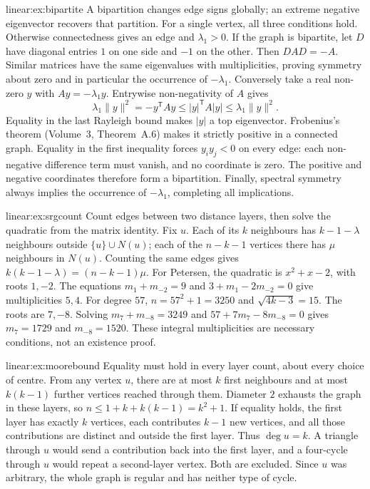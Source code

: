 \begin{solution}{linear:ex:bipartite}
\idea A bipartition changes edge signs globally; an extreme negative eigenvector recovers that partition.
\writeup For a single vertex, all three conditions hold. Otherwise connectedness gives an edge and $\lambda_1>0$. If the graph is bipartite, let $D$ have diagonal entries $1$ on one side and $-1$ on the other. Then $DAD=-A$. Similar matrices have the same eigenvalues with multiplicities, proving symmetry about zero and in particular the occurrence of $-\lambda_1$.
Conversely take a real non-zero $y$ with $Ay=-\lambda_1y$. Entrywise non-negativity of $A$ gives
\[
\lambda_1\|y\|^2=-y^{\mathsf T}Ay
\le |y|^{\mathsf T}A|y|\le\lambda_1\|y\|^2.
\]
Equality in the last Rayleigh bound makes $|y|$ a top eigenvector. Frobenius's theorem (Volume~3, Theorem~A.6) makes it strictly positive in a connected graph. Equality in the first inequality forces $y_iy_j<0$ on every edge: each non-negative difference term must vanish, and no coordinate is zero. The positive and negative coordinates therefore form a bipartition. Finally, spectral symmetry always implies the occurrence of $-\lambda_1$, completing all implications.
\end{solution}

\begin{solution}{linear:ex:srgcount}
\idea Count edges between two distance layers, then solve the quadratic from the matrix identity.
\writeup Fix $u$. Each of its $k$ neighbours has $k-1-\lambda$ neighbours outside $\{u\}\cup N(u)$; each of the $n-k-1$ vertices there has $\mu$ neighbours in $N(u)$. Counting the same edges gives $k(k-1-\lambda)=(n-k-1)\mu$.
For Petersen, the quadratic is $x^2+x-2$, with roots $1,-2$. The equations $m_1+m_{-2}=9$ and $3+m_1-2m_{-2}=0$ give multiplicities $5,4$.
For degree $57$, $n=57^2+1=3250$ and $\sqrt{4k-3}=15$. The roots are $7,-8$. Solving $m_7+m_{-8}=3249$ and $57+7m_7-8m_{-8}=0$ gives $m_7=1729$ and $m_{-8}=1520$. These integral multiplicities are necessary conditions, not an existence proof.
\end{solution}

\begin{solution}{linear:ex:moorebound}
\idea Equality must hold in every layer count, about every choice of centre.
\writeup From any vertex $u$, there are at most $k$ first neighbours and at most $k(k-1)$ further vertices reached through them. Diameter $2$ exhausts the graph in these layers, so $n\le1+k+k(k-1)=k^2+1$. If equality holds, the first layer has exactly $k$ vertices, each contributes $k-1$ new vertices, and all those contributions are distinct and outside the first layer. Thus $\deg u=k$. A triangle through $u$ would send a contribution back into the first layer, and a four-cycle through $u$ would repeat a second-layer vertex. Both are excluded. Since $u$ was arbitrary, the whole graph is regular and has neither type of cycle.
\end{solution}

